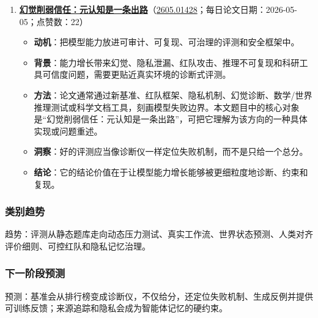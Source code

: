 \begin{enumerate}[leftmargin=1.5em]
  \begin{itemize}[leftmargin=1.5em]
    \item \textbf{动机}：把模型能力放进可审计、可复现、可治理的评测和安全框架中。
    \item \textbf{背景}：能力增长带来幻觉、隐私泄漏、红队攻击、推理不可复现和科研工具可信度问题，需要更贴近真实环境的诊断式评测。
    \item \textbf{方法}：论文通常通过新基准、红队框架、隐私机制、幻觉诊断、数学/世界推理测试或科学文档工具，刻画模型失败边界。本文题目中的核心对象是“CreativityBench：通过基于可供性的工具再利用评估智能体创造性推理”，可把它理解为该方向的一种具体实现或问题重述。
    \item \textbf{洞察}：好的评测应当像诊断仪一样定位失败机制，而不是只给一个总分。
    \item \textbf{结论}：它的结论价值在于让模型能力增长能够被更细粒度地诊断、约束和复现。
  \end{itemize}
  \item \textbf{\href{https://huggingface.co/papers/2605.01428}{幻觉削弱信任：元认知是一条出路}}（\href{https://arxiv.org/abs/2605.01428}{2605.01428}；每日论文日期：2026-05-05；点赞数：22）
  \begin{itemize}[leftmargin=1.5em]
    \item \textbf{动机}：把模型能力放进可审计、可复现、可治理的评测和安全框架中。
    \item \textbf{背景}：能力增长带来幻觉、隐私泄漏、红队攻击、推理不可复现和科研工具可信度问题，需要更贴近真实环境的诊断式评测。
    \item \textbf{方法}：论文通常通过新基准、红队框架、隐私机制、幻觉诊断、数学/世界推理测试或科学文档工具，刻画模型失败边界。本文题目中的核心对象是“幻觉削弱信任：元认知是一条出路”，可把它理解为该方向的一种具体实现或问题重述。
    \item \textbf{洞察}：好的评测应当像诊断仪一样定位失败机制，而不是只给一个总分。
    \item \textbf{结论}：它的结论价值在于让模型能力增长能够被更细粒度地诊断、约束和复现。
  \end{itemize}
\end{enumerate}

\subsubsection{类别趋势}
趋势：评测从静态题库走向动态压力测试、真实工作流、世界状态预测、人类对齐评价细则、可控红队和隐私记忆治理。

\subsubsection{下一阶段预测}
预测：基准会从排行榜变成诊断仪，不仅给分，还定位失败机制、生成反例并提供可训练反馈；来源追踪和隐私会成为智能体记忆的硬约束。

